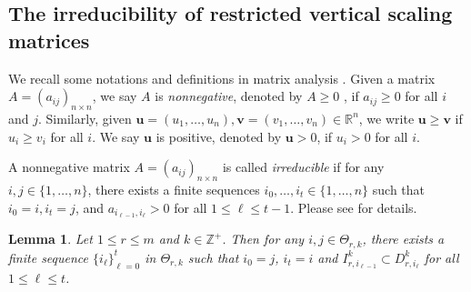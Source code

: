 \documentclass[11pt]{amsart}
\newtheorem{lem}[thm]{Lemma}
\theoremstyle{definition}
\theoremstyle{remark}
\numberwithin{equation}{section}
\newcommand{\bR}{{\mathbb R}}
\newcommand{\Z}{{\mathbb Z}}
\newcommand{\bfu}{{\mathbf u}}
\newcommand{\bfv}{{\mathbf v}}
\begin{document}
\subsection{The irreducibility of restricted vertical scaling matrices}
We recall some notations and definitions in matrix analysis \cite{HJ13}.
Given a matrix $A=(a_{ij})_{n\times n}$, we say $A$ is \emph{nonnegative}, denoted by $A\geq 0$ , if $a_{ij}\geq0$ for all $i$ and $j$.
 Similarly, given $\bfu=(u_1,\ldots,u_n),\bfv=(v_1,\ldots,v_n)\in \bR^n$, we write $\bfu \geq \bfv$ if $u_i\geq v_i$ for all $i$. We say $\bfu$ is positive, denoted by $\bfu>0$, if $u_{i}>0$ for all $i$.

 A nonnegative matrix $A=(a_{ij})_{n\times n}$ is called \emph{irreducible} if for any $i,j\in \{1,\ldots,n\}$, there exists a finite sequences $i_0,\ldots,i_t\in\{1,\ldots,n\}$ such that $i_0=i,i_t=j$, and $a_{i_{\ell-1},i_{\ell}}>0$ for all $1\leq \ell\leq t-1$. Please see \cite{HJ13} for details. 
 

\begin{lem}\label{lem3.3}
 Let $1\leq r\leq m$ and $k\in \Z^+$. Then for any $i,j\in \Theta_{r,k}$, there exists a finite sequence $\{i_\ell\}_{\ell=0}^t$ in $\Theta_{r,k}$ such that $i_0=j$, $i_t=i$ and $I^k_{r,i_{\ell-1}}\subset D_{r,i_\ell}^k$ for all $1\leq \ell \leq t$.
\end{lem}
 
\end{document}
